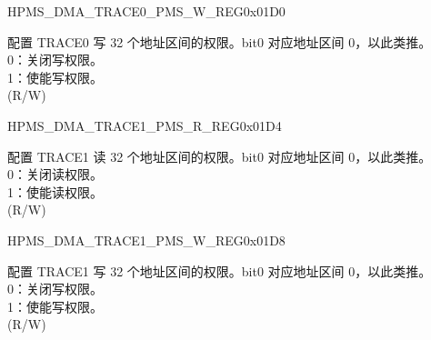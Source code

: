 \begin{register}{H}{PMS\_DMA\_TRACE0\_PMS\_W\_REG}{0x01D0}\label{regdesc:PMSDMATRACE0PMSWREG}
%
\regnewline%
\begin{regdesc}\begin{reglist}
\label{fielddesc:PMSDMATRACE0WPMS}\item [PMS\_DMA\_TRACE0\_W\_PMS] 配置 TRACE0 写 32 个地址区间的权限。bit0 对应地址区间 0，以此类推。\\
0：关闭写权限。\\
1：使能写权限。\\ (R/W)
\end{reglist}\end{regdesc}
\end{register}


\begin{register}{H}{PMS\_DMA\_TRACE1\_PMS\_R\_REG}{0x01D4}\label{regdesc:PMSDMATRACE1PMSRREG}
%
\regnewline%
\begin{regdesc}\begin{reglist}
\label{fielddesc:PMSDMATRACE1RPMS}\item [PMS\_DMA\_TRACE1\_R\_PMS] 配置 TRACE1 读 32 个地址区间的权限。bit0 对应地址区间 0，以此类推。\\
0：关闭读权限。\\
1：使能读权限。\\ (R/W)
\end{reglist}\end{regdesc}
\end{register}


\begin{register}{H}{PMS\_DMA\_TRACE1\_PMS\_W\_REG}{0x01D8}\label{regdesc:PMSDMATRACE1PMSWREG}
%
\regnewline%
\begin{regdesc}\begin{reglist}
\label{fielddesc:PMSDMATRACE1WPMS}\item [PMS\_DMA\_TRACE1\_W\_PMS] 配置 TRACE1 写 32 个地址区间的权限。bit0 对应地址区间 0，以此类推。\\
0：关闭写权限。\\
1：使能写权限。\\ (R/W)
\end{reglist}\end{regdesc}
\end{register}


